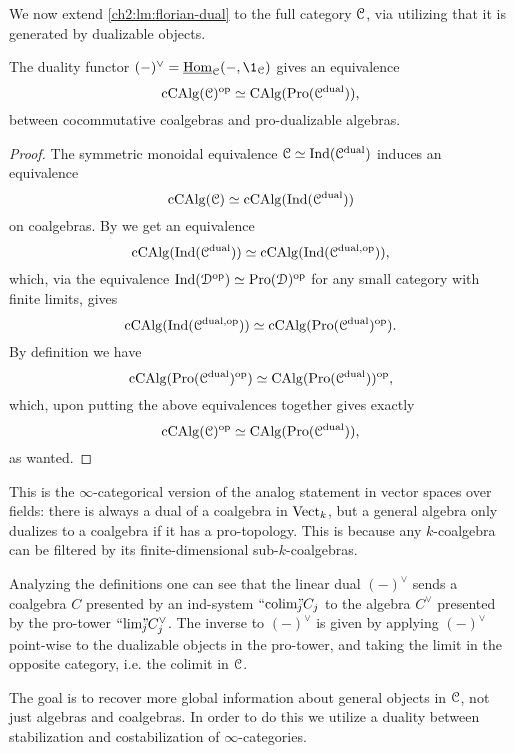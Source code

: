 We now extend \cref{ch2:lm:florian-dual} to the full category $\EuScript{C}$, via utilizing that it is generated by dualizable objects. 

\begin{lemma}
    \label{ch2:lm:sweedler-duality}
    The duality functor $(-)^\vee = \iHom_\C(-,\1_\C)$ gives an equivalence 
    \[\operatorname{cCAlg}(\EuScript{C})^{\mathrm{op}}\simeq \operatorname{CAlg}(\operatorname{Pro}(\EuScript{C}^{\mathrm{dual}})),\]
    between cocommutative coalgebras and pro-dualizable algebras.
\end{lemma}
\begin{proof}
    The symmetric monoidal equivalence $\EuScript{C}\simeq \operatorname{Ind}(\EuScript{C}^{\mathrm{dual}})$ induces an equivalence 
    \[\operatorname{cCAlg}(\EuScript{C}) \simeq \operatorname{cCAlg}(\operatorname{Ind}(\EuScript{C}^{\mathrm{dual}}))\]
    on coalgebras. By \cite[3.2.4]{lurie_2018_ELL1} we get an equivalence 
    \[\operatorname{cCAlg}(\operatorname{Ind}(\EuScript{C}^{\mathrm{dual}}))\simeq \operatorname{cCAlg}(\operatorname{Ind}(\EuScript{C}^{\mathrm{dual}, \mathrm{op}})),\]
    which, via the equivalence $\operatorname{Ind}(\EuScript{D}^{\mathrm{op}})\simeq \operatorname{Pro}(\EuScript{D})^{\mathrm{op}}$ for any small category with finite limits, gives 
    \[\operatorname{cCAlg}(\operatorname{Ind}(\EuScript{C}^{\mathrm{dual}, \mathrm{op}}))\simeq \operatorname{cCAlg}(\operatorname{Pro}(\EuScript{C}^{\mathrm{dual}})^{\mathrm{op}}).\]
    By definition we have 
    \[\operatorname{cCAlg}(\operatorname{Pro}(\EuScript{C}^{\mathrm{dual}})^{\mathrm{op}})\simeq \operatorname{CAlg}(\operatorname{Pro}(\EuScript{C}^{\mathrm{dual}}))^{\mathrm{op}},\]
    which, upon putting the above equivalences together gives exactly 
    \[\operatorname{cCAlg}(\EuScript{C})^{\mathrm{op}}\simeq \operatorname{CAlg}(\operatorname{Pro}(\EuScript{C}^{\mathrm{dual}})),\]
    as wanted. 
\end{proof}

\begin{remark}
    This is the $\infty$-categorical version of the analog statement in vector spaces over fields: there is always a dual of a coalgebra in $\mathrm{Vect}_k$, but a general algebra only dualizes to a coalgebra if it has a pro-topology. This is because any $k$-coalgebra can be filtered by its finite-dimensional sub-$k$-coalgebras. 
\end{remark}

\begin{remark}
    \label{ch2:rm:coalebra-in-Ind}
    Analyzing the definitions one can see that the linear dual $(-)^\vee$ sends a coalgebra $C$ presented by an ind-system $``\!\operatorname{colim}\!"_{\hspace{-5pt} j} C_j$ to the algebra $C^\vee$ presented by the pro-tower $``\!\lim\!"_{\hspace{-5pt} j} C_j^\vee$. The inverse to $(-)^\vee$ is given by applying $(-)^\vee$ point-wise to the dualizable objects in the pro-tower, and taking the limit in the opposite category, i.e. the colimit in $\EuScript{C}$. 
\end{remark}

The goal is to recover more global information about general objects in $\EuScript{C}$, not just algebras and coalgebras. In order to do this we utilize a duality between stabilization and costabilization of $\infty$-categories. 

